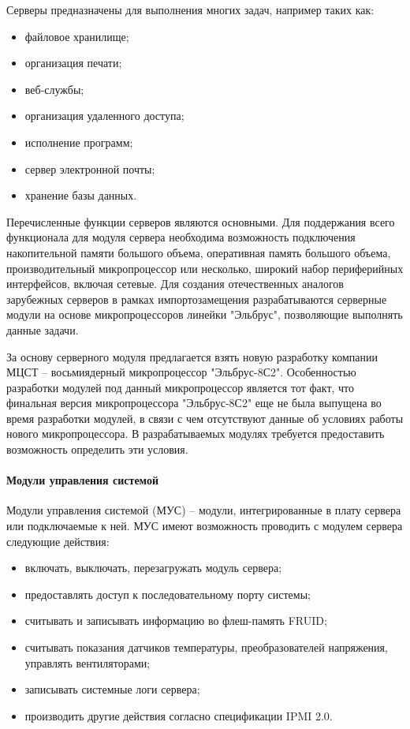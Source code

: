 Серверы предназначены для выполнения многих задач, например таких как:

\begin{itemize}
	\item файловое хранилище;
	\item организация печати;
	\item веб-службы;
	\item организация удаленного доступа;
	\item исполнение программ;
	\item сервер электронной почты;
	\item хранение базы данных.
\end{itemize} \cite{windows_server_app}

Перечисленные функции серверов являются основными. Для поддержания всего функционала для модуля сервера необходима возможность подключения накопительной памяти большого объема, оперативная память большого объема, производительный микропроцессор или несколько, широкий набор периферийных интерфейсов, включая сетевые. Для создания отечественных аналогов зарубежных серверов в рамках импортозамещения разрабатываются серверные модули на основе микропроцессоров линейки "Эльбрус", позволяющие выполнять данные задачи.

За основу серверного модуля предлагается взять новую разработку компании МЦСТ -- восьмиядерный микропроцессор "Эльбрус-8С2". Особенностью разработки модулей под данный микропроцессор является тот факт, что финальная версия микропроцессора "Эльбрус-8С2" еще не была выпущена во время разработки модулей, в связи с чем отсутствуют данные об условиях работы нового микропроцессора. В разрабатываемых модулях требуется предоставить возможность определить эти условия. 

\paragraph{Модули управления системой}

Модули управления системой (МУС) -- модули, интегрированные в плату сервера или подключаемые к ней. МУС имеют возможность проводить с модулем сервера следующие действия: \cite{mus-c}

\begin{itemize}
	\item включать, выключать, перезагружать модуль сервера;
	\item предоставлять доступ к последовательному порту системы;
	\item считывать и записывать информацию во флеш-память FRUID;
	\item считывать показания датчиков температуры, преобразователей напряжения, управлять вентиляторами;
	\item записывать системные логи сервера;
	\item производить другие действия согласно спецификации IPMI 2.0.
\end{itemize}

